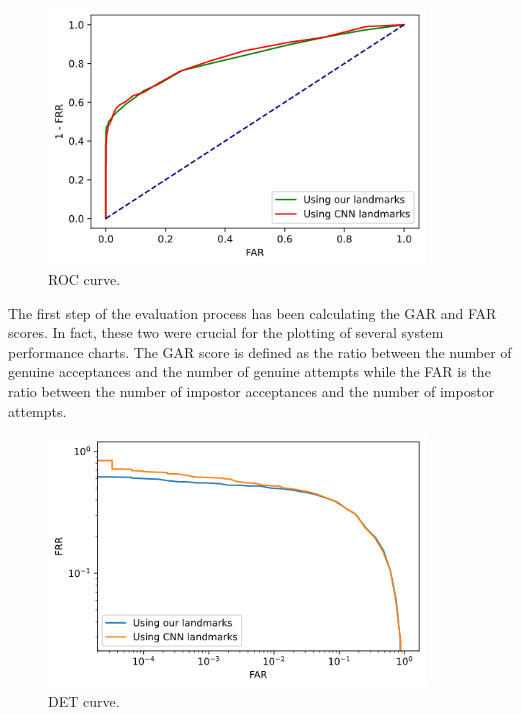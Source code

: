 \documentclass{article}
\begin{document}
\begin{figure}[H]
    \label{fig:roc}
    \begin{center}
        \includegraphics[width=10cm,keepaspectratio]{images/roc_updated.png}
        \caption{ROC curve.}
    \end{center}
\end{figure}

The first step of the evaluation process has been calculating the GAR and FAR scores. 
In fact, these two were crucial for the plotting of several system performance charts. 
The GAR score is defined as the ratio between the number of genuine acceptances and the 
number of genuine attempts while the FAR is the ratio between the number of impostor 
acceptances and the number of impostor attempts.\\

\begin{figure}[H]
    \label{fig:det}
    \begin{center}
        \includegraphics[width=10cm,keepaspectratio]{images/det_updated.png}
        \caption{DET curve.}
    \end{center}
\end{figure}

\blindtext
\end{document}
